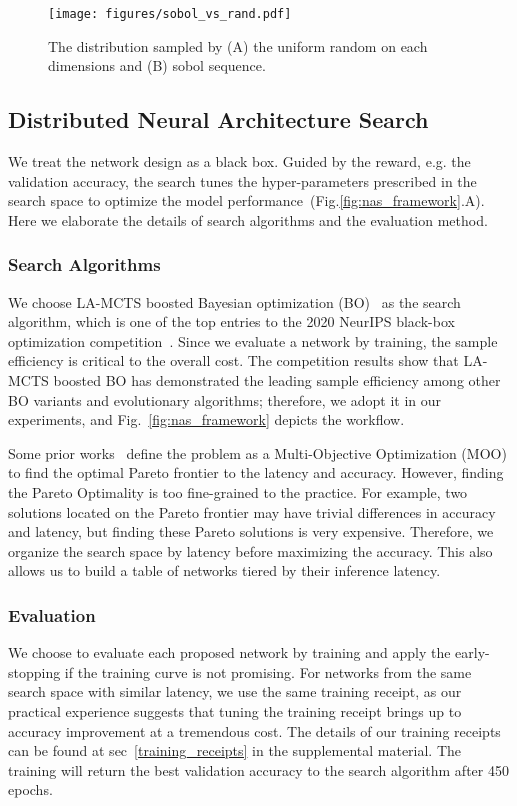 \documentclass[10pt,twocolumn,letterpaper]{article}
\begin{document}
\begin{figure}[t]
\centering 
\vspace{-0.5cm}
  \begin{center}
    \texttt{[image: figures/sobol\_vs\_rand.pdf]}
  \end{center}
    \vspace{-0.5cm}
    \caption{The distribution sampled by (A) the uniform random on each dimensions and (B) sobol sequence.}
    \label{fig:sobolvsrandom}
\end{figure}

\subsection{Distributed Neural Architecture Search}
We treat the network design as a black box. Guided by the reward, e.g. the validation accuracy, the search tunes the hyper-parameters prescribed in the search space to optimize the model performance~(Fig.\ref{fig:nas_framework}.A). Here we elaborate the details of search algorithms and the evaluation method.

\subsubsection{Search Algorithms}
We choose LA-MCTS boosted Bayesian optimization (BO)~\cite{wang2020learning} as the search algorithm, which is one of the top entries to the 2020 NeurIPS black-box optimization competition~\cite{BBOC}. Since we evaluate a network by training, the sample efficiency is critical to the overall cost. The competition results show that LA-MCTS boosted BO has demonstrated the leading sample efficiency among other BO variants and evolutionary algorithms; therefore, we adopt it in our experiments, and Fig.~\ref{fig:nas_framework} depicts the workflow.

Some prior works~\cite{lu2019nsga} define the problem as a Multi-Objective Optimization (MOO) to find the optimal Pareto frontier to the latency and accuracy. However, finding the Pareto Optimality is too fine-grained to the practice. For example, two solutions located on the Pareto frontier may have trivial differences in accuracy and latency, but finding these Pareto solutions is very expensive. Therefore, we organize the search space by latency before maximizing the accuracy. This also allows us to build a table of networks tiered by their inference latency.

\subsubsection{Evaluation}
\label{sec:evaluation}
We choose to evaluate each proposed network by training and apply the early-stopping if the training curve is not promising. For networks from the same search space with similar latency, we use the same training receipt, as our practical experience suggests that tuning the training receipt brings up to  accuracy improvement at a tremendous cost. The details of our training receipts can be found at sec~\ref{training_receipts} in the supplemental material. The training will return the best validation accuracy to the search algorithm after 450 epochs.
\end{document}
